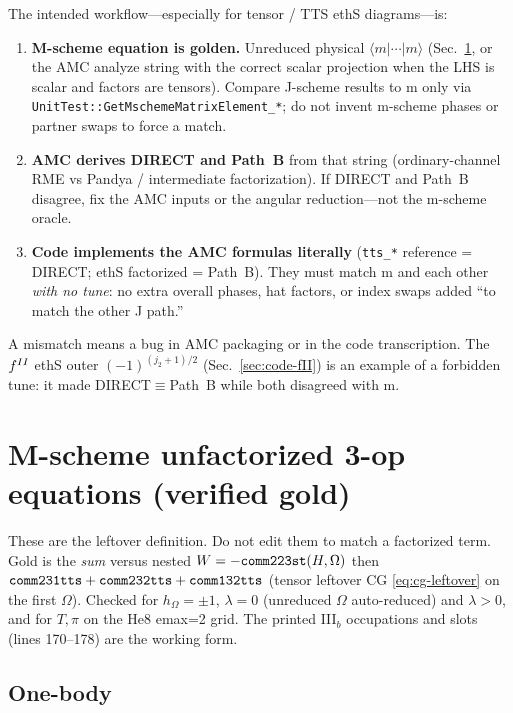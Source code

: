 \documentclass[enabledeprecatedfontcommands]{scrartcl}
\newcommand{\codename}[1]{\texttt{#1}}
\newcommand{\MyRomanNum}[1]{%
  \ifcase#1\or I\or II\or III\or IV\or V\or VI\or VII\or VIII\or IX\or X\else #1\fi}
\begin{document}
The intended workflow---especially for tensor / TTS ethS diagrams---is:
\begin{enumerate}
  \item \textbf{M-scheme equation is golden.}
    Unreduced physical $\langle m|\cdots|m\rangle$
    (Sec.~\ref{sec:unfact}, or the AMC analyze string with the correct
    scalar projection when the LHS is scalar and factors are tensors).
    Compare J-scheme results to m only via
    \codename{UnitTest::GetMschemeMatrixElement\_*}; do not invent m-scheme
    phases or partner swaps to force a match.
  \item \textbf{AMC derives DIRECT and Path~B} from that string
    (ordinary-channel RME vs Pandya / intermediate factorization).
    If DIRECT and Path~B disagree, fix the AMC inputs or the angular
    reduction---not the m-scheme oracle.
  \item \textbf{Code implements the AMC formulas literally}
    (\codename{tts\_*} reference = DIRECT; ethS factorized = Path~B).
    They must match m and each other \emph{with no tune}: no extra overall
    phases, hat factors, or index swaps added ``to match the other J path.''
\end{enumerate}
A mismatch means a bug in AMC packaging or in the code transcription.
The $f^{\MyRomanNum{2}}$ ethS outer
$(-1)^{(j_2+1)/2}$ (Sec.~\ref{sec:code-fII}) is an example of a forbidden
tune: it made DIRECT$\equiv$Path~B while both disagreed with m.

\section{M-scheme unfactorized 3-op equations (verified gold)}
\label{sec:unfact}

These are the leftover definition. Do not edit them to match a factorized
term. Gold is the \emph{sum} versus nested
$W=-{\tt comm223st}(H,\Omega)$ then
${\tt comm231tts}+{\tt comm232tts}+{\tt comm132tts}$
(tensor leftover CG \eqref{eq:cg-leftover} on the first $\Omega$).
Checked for $h_\Omega=\pm1$, $\lambda=0$ (unreduced $\Omega$ auto-reduced)
and $\lambda>0$, and for $T,\pi$ on the He8 emax=2 grid.
The printed III$_b$ occupations and slots (lines 170--178) are the working
form.

\subsection{One-body}
\label{sec:unfact1b}
\end{document}
